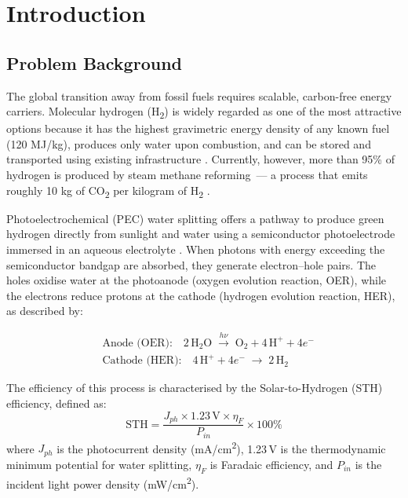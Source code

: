 \chapter{Introduction}\label{ch:intro}

\section{Problem Background}

The global transition away from fossil fuels requires scalable, carbon-free energy
carriers. Molecular hydrogen (H\textsubscript{2}) is widely regarded as one of the
most attractive options because it has the highest gravimetric energy density of any
known fuel (120 MJ/kg), produces only water upon combustion, and can be stored and
transported using existing infrastructure \cite{turner2004sustainable}.
Currently, however, more than 95\% of hydrogen is produced by steam methane
reforming~— a process that emits roughly 10 kg of CO\textsubscript{2} per
kilogram of H\textsubscript{2} \cite{crabtree2004hydrogen}.

Photoelectrochemical (PEC) water splitting offers a pathway to produce green hydrogen
directly from sunlight and water using a semiconductor photoelectrode immersed in an
aqueous electrolyte \cite{fujishima1972electrochemical}.
When photons with energy exceeding the semiconductor bandgap are absorbed, they
generate electron--hole pairs.
The holes oxidise water at the photoanode (oxygen evolution reaction, OER), while
the electrons reduce protons at the cathode (hydrogen evolution reaction, HER),
as described by:

\begin{align}
  &\text{Anode (OER):}\quad 2\,\text{H}_2\text{O} \;\xrightarrow{h\nu}\; \text{O}_2 + 4\,\text{H}^+ + 4e^- \\
  &\text{Cathode (HER):}\quad 4\,\text{H}^+ + 4e^- \;\to\; 2\,\text{H}_2
\end{align}

The efficiency of this process is characterised by the Solar-to-Hydrogen (STH)
efficiency, defined as:
\begin{equation}
  \text{STH} = \frac{J_{ph} \times 1.23\,\text{V} \times \eta_F}{P_{in}} \times 100\%
  \label{eq:sth}
\end{equation}
where $J_{ph}$ is the photocurrent density (mA/cm\textsuperscript{2}),
1.23\,V is the thermodynamic minimum potential for water splitting,
$\eta_F$ is Faradaic efficiency, and
$P_{in}$ is the incident light power density (mW/cm\textsuperscript{2}).

